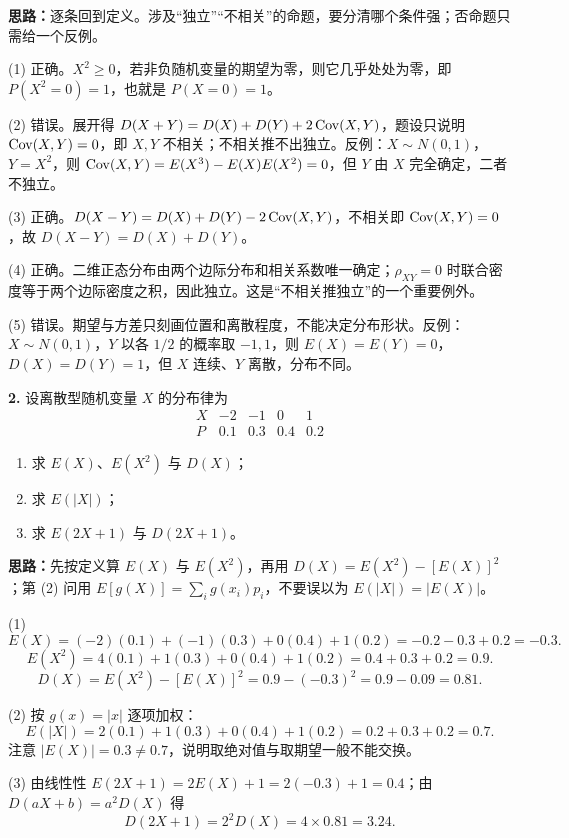 \ifshowsolutions%
\textbf{思路：}逐条回到定义。涉及“独立”“不相关”的命题，要分清哪个条件强；否命题只需给一个反例。

(1) 正确。$X^2\ge0$，若非负随机变量的期望为零，则它几乎处处为零，即 $P(X^2=0)=1$，也就是 $P(X=0)=1$。

(2) 错误。展开得 $D(X+Y)=D(X)+D(Y)+2\operatorname{Cov}(X,Y)$，题设只说明 $\operatorname{Cov}(X,Y)=0$，即 $X,Y$ 不相关；不相关推不出独立。反例：$X\sim N(0,1)$，$Y=X^2$，则 $\operatorname{Cov}(X,Y)=E(X^3)-E(X)E(X^2)=0$，但 $Y$ 由 $X$ 完全确定，二者不独立。

(3) 正确。$D(X-Y)=D(X)+D(Y)-2\operatorname{Cov}(X,Y)$，不相关即 $\operatorname{Cov}(X,Y)=0$，故 $D(X-Y)=D(X)+D(Y)$。

(4) 正确。二维正态分布由两个边际分布和相关系数唯一确定；$\rho_{XY}=0$ 时联合密度等于两个边际密度之积，因此独立。这是“不相关推独立”的一个重要例外。

(5) 错误。期望与方差只刻画位置和离散程度，不能决定分布形状。反例：$X\sim N(0,1)$，$Y$ 以各 $1/2$ 的概率取 $-1,1$，则 $E(X)=E(Y)=0$，$D(X)=D(Y)=1$，但 $X$ 连续、$Y$ 离散，分布不同。


\else \answerarea[8] \fi

\textbf{2.} 设离散型随机变量 $X$ 的分布律为
\[
\begin{array}{c|cccc}
X & -2 & -1 & 0 & 1 \\
\hline
P & 0.1 & 0.3 & 0.4 & 0.2
\end{array}
\]
\begin{enumerate}[label=(\arabic*)]
    \item 求 $E(X)$、$E(X^2)$ 与 $D(X)$；
    \item 求 $E(|X|)$；
    \item 求 $E(2X+1)$ 与 $D(2X+1)$。
\end{enumerate}

\ifshowsolutions%
\textbf{思路：}先按定义算 $E(X)$ 与 $E(X^2)$，再用 $D(X)=E(X^2)-[E(X)]^2$；第 (2) 问用 $E[g(X)]=\sum_i g(x_i)p_i$，不要误以为 $E(|X|)=|E(X)|$。

(1)
\[
E(X)=(-2)(0.1)+(-1)(0.3)+0(0.4)+1(0.2)=-0.2-0.3+0.2=-0.3.
\]
\[
E(X^2)=4(0.1)+1(0.3)+0(0.4)+1(0.2)=0.4+0.3+0.2=0.9.
\]
\[
D(X)=E(X^2)-[E(X)]^2=0.9-(-0.3)^2=0.9-0.09=0.81.
\]

(2) 按 $g(x)=|x|$ 逐项加权：
\[
E(|X|)=2(0.1)+1(0.3)+0(0.4)+1(0.2)=0.2+0.3+0.2=0.7.
\]
注意 $|E(X)|=0.3\ne0.7$，说明取绝对值与取期望一般不能交换。

(3) 由线性性 $E(2X+1)=2E(X)+1=2(-0.3)+1=0.4$；由 $D(aX+b)=a^2D(X)$ 得
\[
D(2X+1)=2^2D(X)=4\times0.81=3.24.
\]


